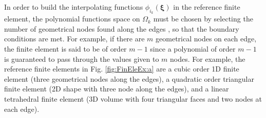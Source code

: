 In order to build the interpolating functions $\phi_{i_k}(\boldsymbol{\xi})$ in the reference finite element, the polynomial functions space on $\Omega_k$ must be chosen by selecting the number of geometrical nodes found along the  edges \cite{larson_finite_2013}, so that the boundary conditions are met. For example, if there are $m$ geometrical nodes on each edge, the finite element is said to be of order $m-1$ since a polynomial of order $m-1$ is guaranteed to pass through the values given to  $m$ nodes. For example, the reference finite elements in Fig. \ref{fig:FinEleEx:a} are a cubic order 1D finite element (three geometrical nodes along the edges), a quadratic order triangular finite element (2D shape with three node along the edges), and a linear tetrahedral finite element (3D volume with four triangular faces and two nodes at each edge).

